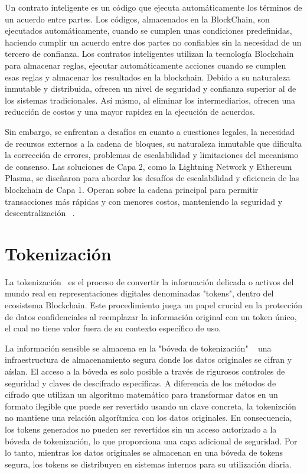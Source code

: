 Un contrato inteligente es un código que ejecuta automáticamente los términos de un acuerdo entre partes. Los códigos, almacenados en la BlockChain, son ejecutados automáticamente, cuando se cumplen unas condiciones predefinidas, haciendo cumplir un acuerdo entre dos partes no confiables sin la necesidad de un tercero de confianza.
Los contratos inteligentes utilizan la tecnología Blockchain para almacenar reglas, ejecutar automáticamente acciones cuando se cumplen esas reglas y almacenar los resultados en la blockchain. Debido a su naturaleza inmutable y distribuida, ofrecen un nivel de seguridad y confianza superior al de los sistemas tradicionales. Así mismo, al eliminar los intermediarios, ofrecen una reducción de costos y una mayor rapidez en la ejecución de acuerdos.

Sin embargo, se enfrentan a desafíos en cuanto a cuestiones legales, la necesidad de recursos externos a la cadena de bloques, su naturaleza inmutable que dificulta la corrección de errores, problemas de escalabilidad y limitaciones del mecanismo de consenso. Las soluciones de Capa 2, como la Lightning Network y Ethereum Plasma, se diseñaron para abordar los desafíos de escalabilidad y eficiencia de las blockchain de Capa 1. Operan sobre la cadena principal para permitir transacciones más rápidas y con menores costos, manteniendo la seguridad y descentralización ~\cite{AplicacionesDesafiosSmartcontract}. 



\section{Tokenización}

La tokenización~\cite{tokenización} es el proceso de convertir la información delicada o activos del mundo real en representaciones digitales denominadas "tokens", dentro del ecosistema Blockchain.
Este procedimiento juega un papel crucial en la protección de datos confidenciales al reemplazar la información original con un token único, el cual no tiene valor fuera de su contexto específico de uso.

La información sensible se almacena en la "bóveda de tokenización" ~\cite{bóvedaTokenización} una infraestructura de almacenamiento segura donde los datos originales se cifran y aíslan. El acceso a la bóveda es solo posible a través de rigurosos controles de seguridad y claves de descifrado especificas.
A diferencia de los métodos de cifrado que utilizan un algoritmo matemático para transformar datos en un formato ilegible que puede ser revertido usando un clave concreta, la tokenizción no mantiene una relación algorítmica con los datos originales. En consecuencia, los tokens generados no pueden ser revertidos sin un acceso autorizado a la bóveda de tokenización, lo que proporciona una capa adicional de seguridad.
Por lo tanto, mientras los datos originales se almacenan en una bóveda de tokens segura, los tokens se distribuyen en sistemas internos para su utilización diaria.

